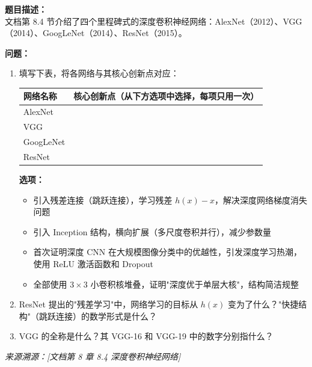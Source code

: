 \documentclass[a4paper,11pt]{ctexart}
\begin{document}
\begin{problembox}
    \textbf{题目描述：}\\
    文档第 8.4 节介绍了四个里程碑式的深度卷积神经网络：AlexNet（2012）、VGG（2014）、GoogLeNet（2014）、ResNet（2015）。

    \vspace{0.2cm}
    \textbf{问题：}
    \begin{enumerate}[(1)]
        \item 填写下表，将各网络与其核心创新点对应：

        \begin{center}
        \begin{tabular}{p{2.8cm} p{8.5cm}}
            \toprule
            网络名称 & 核心创新点（从下方选项中选择，每项只用一次） \\
            \midrule
            AlexNet & \underline{\hspace{7cm}} \\[0.5em]
            VGG & \underline{\hspace{7cm}} \\[0.5em]
            GoogLeNet & \underline{\hspace{7cm}} \\[0.5em]
            ResNet & \underline{\hspace{7cm}} \\
            \bottomrule
        \end{tabular}
        \end{center}

        \textbf{选项：}
        \begin{itemize}
            \item[A.] 引入残差连接（跳跃连接），学习残差 $h(x)-x$，解决深度网络梯度消失问题
            \item[B.] 引入 Inception 结构，横向扩展（多尺度卷积并行），减少参数量
            \item[C.] 首次证明深度 CNN 在大规模图像分类中的优越性，引发深度学习热潮，使用 ReLU 激活函数和 Dropout
            \item[D.] 全部使用 $3\times3$ 小卷积核堆叠，证明"深度优于单层大核"，结构简洁规整
        \end{itemize}

        \item ResNet 提出的"残差学习"中，网络学习的目标从 $h(x)$ 变为了什么？"快捷结构"（跳跃连接）的数学形式是什么？

        \item VGG 的全称是什么？其 VGG-16 和 VGG-19 中的数字分别指什么？
    \end{enumerate}

    \vspace{0.2cm}
    {\color{gray}\small\textit{来源溯源：[文档第 8 章 8.4 深度卷积神经网络]}}
\end{problembox}
\end{document}

